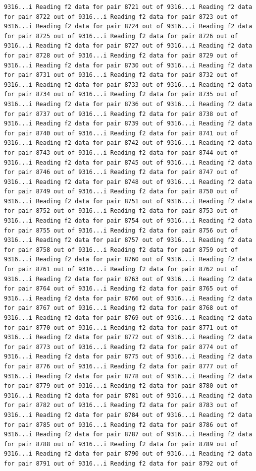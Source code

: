 \documentclass[
]{article}
\begin{document}
\begin{verbatim}
9316...i Reading f2 data for pair 8721 out of 9316...i Reading f2 data for pair 8722 out of 9316...i Reading f2 data for pair 8723 out of 9316...i Reading f2 data for pair 8724 out of 9316...i Reading f2 data for pair 8725 out of 9316...i Reading f2 data for pair 8726 out of 9316...i Reading f2 data for pair 8727 out of 9316...i Reading f2 data for pair 8728 out of 9316...i Reading f2 data for pair 8729 out of 9316...i Reading f2 data for pair 8730 out of 9316...i Reading f2 data for pair 8731 out of 9316...i Reading f2 data for pair 8732 out of 9316...i Reading f2 data for pair 8733 out of 9316...i Reading f2 data for pair 8734 out of 9316...i Reading f2 data for pair 8735 out of 9316...i Reading f2 data for pair 8736 out of 9316...i Reading f2 data for pair 8737 out of 9316...i Reading f2 data for pair 8738 out of 9316...i Reading f2 data for pair 8739 out of 9316...i Reading f2 data for pair 8740 out of 9316...i Reading f2 data for pair 8741 out of 9316...i Reading f2 data for pair 8742 out of 9316...i Reading f2 data for pair 8743 out of 9316...i Reading f2 data for pair 8744 out of 9316...i Reading f2 data for pair 8745 out of 9316...i Reading f2 data for pair 8746 out of 9316...i Reading f2 data for pair 8747 out of 9316...i Reading f2 data for pair 8748 out of 9316...i Reading f2 data for pair 8749 out of 9316...i Reading f2 data for pair 8750 out of 9316...i Reading f2 data for pair 8751 out of 9316...i Reading f2 data for pair 8752 out of 9316...i Reading f2 data for pair 8753 out of 9316...i Reading f2 data for pair 8754 out of 9316...i Reading f2 data for pair 8755 out of 9316...i Reading f2 data for pair 8756 out of 9316...i Reading f2 data for pair 8757 out of 9316...i Reading f2 data for pair 8758 out of 9316...i Reading f2 data for pair 8759 out of 9316...i Reading f2 data for pair 8760 out of 9316...i Reading f2 data for pair 8761 out of 9316...i Reading f2 data for pair 8762 out of 9316...i Reading f2 data for pair 8763 out of 9316...i Reading f2 data for pair 8764 out of 9316...i Reading f2 data for pair 8765 out of 9316...i Reading f2 data for pair 8766 out of 9316...i Reading f2 data for pair 8767 out of 9316...i Reading f2 data for pair 8768 out of 9316...i Reading f2 data for pair 8769 out of 9316...i Reading f2 data for pair 8770 out of 9316...i Reading f2 data for pair 8771 out of 9316...i Reading f2 data for pair 8772 out of 9316...i Reading f2 data for pair 8773 out of 9316...i Reading f2 data for pair 8774 out of 9316...i Reading f2 data for pair 8775 out of 9316...i Reading f2 data for pair 8776 out of 9316...i Reading f2 data for pair 8777 out of 9316...i Reading f2 data for pair 8778 out of 9316...i Reading f2 data for pair 8779 out of 9316...i Reading f2 data for pair 8780 out of 9316...i Reading f2 data for pair 8781 out of 9316...i Reading f2 data for pair 8782 out of 9316...i Reading f2 data for pair 8783 out of 9316...i Reading f2 data for pair 8784 out of 9316...i Reading f2 data for pair 8785 out of 9316...i Reading f2 data for pair 8786 out of 9316...i Reading f2 data for pair 8787 out of 9316...i Reading f2 data for pair 8788 out of 9316...i Reading f2 data for pair 8789 out of 9316...i Reading f2 data for pair 8790 out of 9316...i Reading f2 data for pair 8791 out of 9316...i Reading f2 data for pair 8792 out of 
\end{verbatim}
\end{document}
